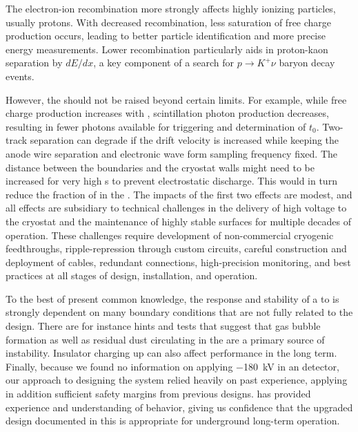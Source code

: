 The electron-ion recombination more strongly affects highly ionizing particles, usually protons.  With decreased recombination, less saturation of free charge production occurs,  leading to better particle identification and more precise energy measurements.  Lower recombination particularly aids in proton-kaon separation by $dE/dx$, a key component of a search for $p\rightarrow K^+ \nu$ baryon decay events. 

However, the \efield should not be raised beyond certain limits. For example, while free charge production increases with \efield, scintillation photon production decreases, resulting in fewer photons available for triggering and determination of $t_0$. Two-track separation can degrade if the drift velocity is increased while keeping the anode wire separation and electronic wave form sampling frequency fixed. The distance between the  boundaries and the cryostat walls might  need to be increased for very high \efield{}s to prevent electrostatic discharge. This would in turn reduce the fraction of  in the . The impacts of the first two effects are modest, and all effects are subsidiary to technical challenges in the delivery of high voltage to the cryostat and the maintenance of highly stable    surfaces for multiple decades of operation. These challenges require development of non-commercial cryogenic  feedthroughs,  ripple-repression through custom   circuits, careful construction and deployment of  cables, redundant  connections, high-precision monitoring, and best practices at all stages of design, installation, and operation.


To the best of present common knowledge, the response and stability of a  to  is strongly dependent on many boundary conditions that are not fully related to the   design. There are for instance hints and tests that suggest that gas bubble formation as well as residual dust circulating in the  are a primary source of  instability. Insulator charging up can also affect  performance in the long term.  
Finally, because we found no information on applying \SI{-180}{\kV} in an  detector, our approach to designing the  system relied heavily on past experience, applying in addition sufficient safety margins from previous designs.  has provided experience and understanding of  behavior, giving us confidence that the upgraded design documented in this  is appropriate for underground long-term operation.  

